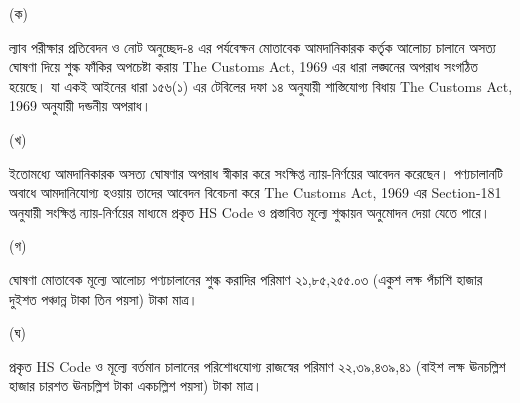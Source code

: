 \documentclass[12pt]{article}
\begin{document}
\begin{minipage}[t]{0.05\linewidth}
(ক)
\end{minipage}
\begin{minipage}[t]{0.90\linewidth}
ল্যাব পরীক্ষার প্রতিবেদন ও নোট অনুচ্ছেদ-৪ এর
পর্যবেক্ষন মোতাবেক আমদানিকারক কর্তৃক আলোচ্য
চালানে অসত্য ঘোষণা দিয়ে শুল্ক ফাঁকির অপচেষ্টা করায়
The Customs Act, 1969
এর ধারা লঙ্ঘনের অপরাধ সংগঠিত হয়েছে।
যা একই আইনের ধারা ১৫৬(১) এর টেবিলের দফা
১৪ অনুযায়ী শাস্তিযোগ্য বিধায়
The Customs Act, 1969
অনুযায়ী দন্ডনীয় অপরাধ।
\\
\end{minipage}
\begin{minipage}[t]{0.05\linewidth}
\hspace{1em}
\end{minipage}
\begin{minipage}[t]{0.05\linewidth}
(খ)
\end{minipage}
\begin{minipage}[t]{0.90\linewidth}
ইতোমধ্যে আমদানিকারক অসত্য ঘোষণার অপরাধ
স্বীকার করে সংক্ষিপ্ত ন্যায়-নির্ণয়ের আবেদন করেছেন।
পণ্যচালানটি অবাধে আমদানিযোগ্য হওয়ায় তাদের আবেদন
বিবেচনা করে
The Customs Act, 1969
এর Section-181
অনুযায়ী সংক্ষিপ্ত ন্যায়-নির্ণয়ের মাধ্যমে
প্রকৃত HS Code ও প্রস্তাবিত মূল্যে
শুল্কায়ন অনুমোদন দেয়া যেতে পারে।
\\
\end{minipage}
\begin{minipage}[t]{0.05\linewidth}
\hspace{1em}
\end{minipage}
\begin{minipage}[t]{0.05\linewidth}
(গ)
\end{minipage}
\begin{minipage}[t]{0.90\linewidth}
ঘোষণা মোতাবেক মূল্যে আলোচ্য পণ্যচালানের শুল্ক করাদির
পরিমাণ ২১,৮৫,২৫৫.০৩
(একুশ লক্ষ পঁচাশি হাজার দুইশত পঞ্চান্ন টাকা তিন পয়সা) টাকা মাত্র।
\\
\end{minipage}
\begin{minipage}[t]{0.05\linewidth}
\hspace{1em}
\end{minipage}
\begin{minipage}[t]{0.05\linewidth}
(ঘ)
\end{minipage}
\begin{minipage}[t]{0.90\linewidth}
প্রকৃত HS Code ও মূল্যে বর্তমান চালানের পরিশোধযোগ্য
রাজস্বের পরিমাণ ২২,৩৯,৪৩৯,৪১
(বাইশ লক্ষ ঊনচল্লিশ হাজার চারশত ঊনচল্লিশ টাকা একচল্লিশ পয়সা) টাকা মাত্র।
\\
\end{minipage}
\end{document}
